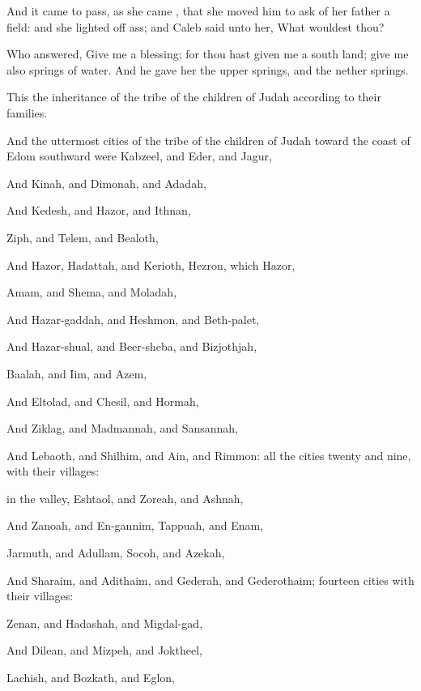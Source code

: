 {And it came to pass, as she
came
{}, that she
moved him to
ask of her
father a
field: and she lighted
off
{}
ass; and
Caleb
said unto her, What wouldest thou?

Who
answered,
Give me a
blessing; for thou hast
given me a
south
land;
give me also
springs of
water. And he
gave her the
upper
springs, and the
nether
springs.


\par }{\PP {}This
{} the
inheritance of the
tribe of the
children of
Judah according to their
families.

And the
uttermost
cities of the
tribe of the
children of
Judah toward the
coast of
Edom
southward were
Kabzeel, and
Eder, and
Jagur,

And
Kinah, and
Dimonah, and
Adadah,

And
Kedesh, and
Hazor, and
Ithnan,

Ziph, and
Telem, and
Bealoth,

And
Hazor,
Hadattah, and
Kerioth,
{}
Hezron, which
{}
Hazor,

Amam, and
Shema, and
Moladah,

And
Hazar-gaddah, and
Heshmon, and
Beth-palet,

And
Hazar-shual, and
Beer-sheba, and
Bizjothjah,

Baalah, and
Iim, and
Azem,

And
Eltolad, and
Chesil, and
Hormah,

And
Ziklag, and
Madmannah, and
Sansannah,

And
Lebaoth, and
Shilhim, and
Ain, and
Rimmon: all the
cities
{}
twenty and
nine, with their
villages:

 in the
valley,
Eshtaol, and
Zoreah, and
Ashnah,

And
Zanoah, and
En-gannim,
Tappuah, and
Enam,

Jarmuth, and
Adullam,
Socoh, and
Azekah,

And
Sharaim, and
Adithaim, and
Gederah, and
Gederothaim;
fourteen
cities with their
villages:

Zenan, and
Hadashah, and
Migdal-gad,

And
Dilean, and
Mizpeh, and
Joktheel,

Lachish, and
Bozkath, and
Eglon,

}
